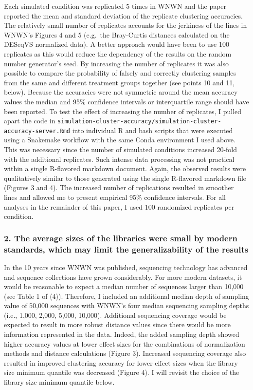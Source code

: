\documentclass[
]{article}
\begin{document}
Each simulated condition was replicated 5 times in WNWN and the paper
reported the mean and standard deviation of the replicate clustering
accuracies. The relatively small number of replicates accounts for the
jerkiness of the lines in WNWN's Figures 4 and 5 (e.g.~the Bray-Curtis
distances calculated on the DESeqVS normalized data). A better approach
would have been to use 100 replicates as this would reduce the
dependency of the results on the random number generator's seed. By
increasing the number of replicates it was also possible to compare the
probability of falsely and correctly clustering samples from the same
and different treatment groups together (see points 10 and 11, below).
Because the accuracies were not symmetric around the mean accuracy
values the median and 95\% confidence intervals or interquartile range
should have been reported. To test the effect of increasing the number
of replicates, I pulled apart the code in
\texttt{simulation-cluster-accuracy/simulation-cluster-accuracy-server.Rmd}
into individual R and bash scripts that were executed using a Snakemake
workflow with the same Conda environment I used above. This was
necessary since the number of simulated conditions increased 20-fold
with the additional replicates. Such intense data processing was not
practical within a single R-flavored markdown document. Again, the
observed results were qualitatively similar to those generated using the
single R-flavored markdown file (Figures 3 and 4). The increased number
of replications resulted in smoother lines and allowed me to present
empirical 95\% confidence intervals. For all analyses in the remainder
of this paper, I used 100 randomized replicates per condition.

\hypertarget{the-average-sizes-of-the-libraries-were-small-by-modern-standards-which-may-limit-the-generalizability-of-the-results}{%
\subsubsection{2. The average sizes of the libraries were small by
modern standards, which may limit the generalizability of the
results}\label{the-average-sizes-of-the-libraries-were-small-by-modern-standards-which-may-limit-the-generalizability-of-the-results}}

In the 10 years since WNWN was published, sequencing technology has
advanced and sequence collections have grown considerably. For more
modern datasets, it would be reasonable to expect a median number of
sequences larger than 10,000 (see Table 1 of (4)). Therefore, I included
an additional median depth of sampling value of 50,000 sequences with
WNWN's four median sequencing sampling depths (i.e., 1,000, 2,000,
5,000, 10,000). Additional sequencing coverage would be expected to
result in more robust distance values since there would be more
information represented in the data. Indeed, the added sampling depth
showed higher accuracy values at lower effect sizes for the combinations
of normalization methods and distance calculations (Figure 3). Increased
sequencing coverage also resulted in improved clustering accuracy for
lower effect sizes when the library size minimum quantile was decreased
(Figure 4). I will revisit the choice of the library size minimum
quantile below.
\end{document}
